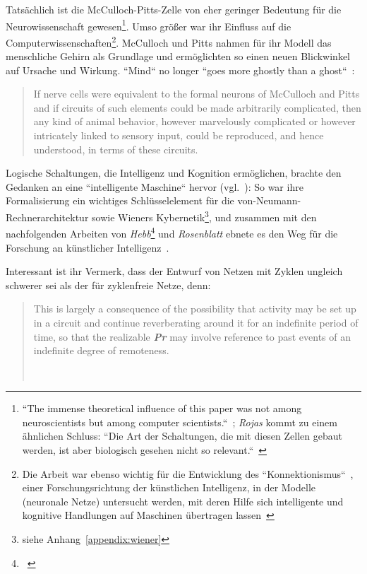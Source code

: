 Tatsächlich ist die McCulloch-Pitts-Zelle von eher geringer Bedeutung für die Neurowissenschaft gewesen\footnote{
    ``The immense theoretical influence of this paper was not among neuroscientists but among computer scientists.``~\cite[17]{AR88}; \textit{Rojas} kommt zu einem ähnlichen Schluss: ``Die Art der Schaltungen, die mit
    diesen Zellen gebaut werden, ist aber biologisch gesehen nicht so relevant.``~\cite[51]{Roj93}
}.
Umso größer war ihr Einfluss auf die Computerwissenschaften\footnote{
    Die Arbeit war ebenso wichtig für die Entwicklung des ``Konnektionismus``~\cite[11]{Arb19}, einer Forschungsrichtung der künstlichen Intelligenz, in der Modelle (neuronale Netze) untersucht werden, mit deren Hilfe sich intelligente und kognitive Handlungen auf Maschinen übertragen lassen~\cite[v]{Dor91}
}.
McCulloch und Pitts nahmen für ihr Modell das menschliche Gehirn als Grundlage und ermöglichten so einen neuen Blickwinkel auf Ursache und Wirkung. ``Mind`` no longer ``goes more ghostly than a ghost``~\cite[114]{MP43}:

\blockquote[{\cite[9]{Per88}}]{
    If nerve cells were equivalent to the formal neurons of McCulloch and Pitts and if circuits of such elements could be made arbitrarily complicated, then any kind of animal behavior, however marvelously complicated or however intricately linked to sensory input, could be reproduced, and hence understood, in terms of these circuits.
}

Logische Schaltungen, die Intelligenz und Kognition ermöglichen, brachte den Gedanken an eine ``intelligente Maschine`` hervor (vgl.~\cite[204]{Pic04}): So war ihre Formalisierung ein wichtiges Schlüsselelement für die von-Neumann-Rechnerarchitektur \cite{Neu93} sowie Wieners Kybernetik\footnote{siehe Anhang~\ref{appendix:wiener}}, und zusammen mit den nachfolgenden Arbeiten von \textit{Hebb}\footnote{~\cite{Heb49}} und \textit{Rosenblatt} ebnete es den Weg für die Forschung an künstlicher Intelligenz~\cite[1]{Arb19}.

\noindent
Interessant ist ihr Vermerk, dass der Entwurf von Netzen mit Zyklen ungleich schwerer sei als der für zyklenfreie Netze, denn:

\blockquote[{~\cite[108, Hervorhebungen i.O.]{MP43}}]{
    This is largely a consequence of the possibility that activity may be set up in a circuit and continue reverberating around it for an indefinite period of time, so that the realizable \textbf{\textit{Pr}} may involve reference to past events of an indefinite degree of remoteness.
}

